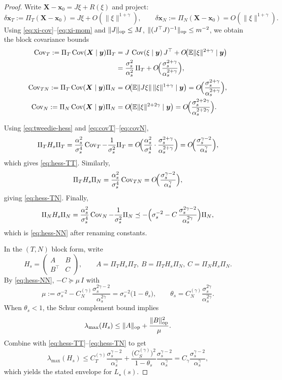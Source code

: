 \documentclass[12pt]{article}
\theoremstyle{definition} %
\newcommand{\X}{\bm X}
\newcommand{\y}{\bm y}
\newcommand{\x}{\bm x}
\newcommand{\Cov}{\operatorname{Cov}}
\providecommand{\E}{\mathbb{E}}
\begin{document}
\begin{proof}
\smallskip
Write $\X-\x_0=J\xi+R(\xi)$ and project:
\[
\delta \x_T:=\Pi_T(\X-\x_0)=J\xi+O(\|\xi\|^{1+\gamma}),
\qquad
\delta \x_N:=\Pi_N(\X-\x_0)=O(\|\xi\|^{1+\gamma}).
\]
Using \eqref{eq:xi-cov}--\eqref{eq:xi-mom} and $\|J\|_{\rm op}\le M$, $\|(J^\top J)^{-1}\|_{\rm op}\le m^{-2}$,
we obtain the block covariance bounds
\begin{align}
\Cov_T:=\Pi_T\Cov(\X\mid \y)\Pi_T
&=J\,\Cov(\xi\mid \y)\,J^\top + O\!\bigl(\E\|\xi\|^{2+\gamma}\mid \y\bigr)\nonumber\\
&=\frac{\sigma_s^2}{\alpha_s^2}\,\Pi_T
+O\!\Bigl(\frac{\sigma_s^{2+\gamma}}{\alpha_s^{2+\gamma}}\Bigr),
\label{eq:covT}\\
\Cov_{TN}:=\Pi_T\Cov(\X\mid \y)\Pi_N
&=O\!\bigl(\E\|J\xi\|\,\|\xi\|^{1+\gamma}\mid \y\bigr)
=O\!\Bigl(\frac{\sigma_s^{2+\gamma}}{\alpha_s^{2+\gamma}}\Bigr),
\label{eq:covTN}\\
\Cov_N:=\Pi_N\Cov(\X\mid \y)\Pi_N
&=O\!\bigl(\E\|\xi\|^{2+2\gamma}\mid \y\bigr)
=O\!\Bigl(\frac{\sigma_s^{2+2\gamma}}{\alpha_s^{2+2\gamma}}\Bigr).
\label{eq:covN}
\end{align}

\smallskip
Using \eqref{eq:tweedie-hess} and \eqref{eq:covT}--\eqref{eq:covN},
\[
\Pi_T H_s \Pi_T
=\frac{\alpha_s^2}{\sigma_s^4}\Cov_T-\frac{1}{\sigma_s^2}\Pi_T
=O\!\Bigl(\frac{\alpha_s^2}{\sigma_s^4}\cdot\frac{\sigma_s^{2+\gamma}}{\alpha_s^{2+\gamma}}\Bigr)
=O\!\Bigl(\frac{\sigma_s^{\gamma-2}}{\alpha_s^{\gamma}}\Bigr),
\]
which gives \eqref{eq:hess-TT}. Similarly,
\[
\Pi_T H_s \Pi_N
=\frac{\alpha_s^2}{\sigma_s^4}\Cov_{TN}
=O\!\Bigl(\frac{\sigma_s^{\gamma-2}}{\alpha_s^{\gamma}}\Bigr),
\]
giving \eqref{eq:hess-TN}. Finally,
\[
\Pi_N H_s \Pi_N
=\frac{\alpha_s^2}{\sigma_s^4}\Cov_N-\frac{1}{\sigma_s^2}\Pi_N
\preceq
-\Bigl(\sigma_s^{-2}-C\,\frac{\sigma_s^{2\gamma-2}}{\alpha_s^{2\gamma}}\Bigr)\Pi_N,
\]
which is \eqref{eq:hess-NN} after renaming constants.

\smallskip
In the $(T,N)$ block form, write
\[
H_s=
\begin{pmatrix}
A & B\\
B^\top & C
\end{pmatrix},
\qquad
A=\Pi_T H_s\Pi_T,\ B=\Pi_T H_s\Pi_N,\ C=\Pi_N H_s\Pi_N.
\]
By \eqref{eq:hess-NN}, $-C\succeq \mu\,I$ with
\[
\mu:=\sigma_s^{-2}-C_N^{(\gamma)}\frac{\sigma_s^{2\gamma-2}}{\alpha_s^{2\gamma}}
=\sigma_s^{-2}\bigl(1-\theta_s\bigr),
\qquad \theta_s=C_N^{(\gamma)}\frac{\sigma_s^{2\gamma}}{\alpha_s^{2\gamma}}.
\]
When $\theta_s<1$, the Schur complement bound implies
\[
\lambda_{\max}(H_s)
\le \|A\|_{\rm op}+\frac{\|B\|_{\rm op}^2}{\mu}.
\]
Combine with \eqref{eq:hess-TT}--\eqref{eq:hess-TN} to get
\[
\lambda_{\max}(H_s)
\le
C_T^{(\gamma)}\frac{\sigma_s^{\gamma-2}}{\alpha_s^\gamma}
+\frac{\bigl(C_S^{(\gamma)}\bigr)^2}{1-\theta_s}\frac{\sigma_s^{\gamma-2}}{\alpha_s^\gamma}
=
C_\gamma\frac{\sigma_s^{\gamma-2}}{\alpha_s^\gamma},
\]
which yields the stated envelope for $L_\star(s)$.
\end{proof}
\end{document}
